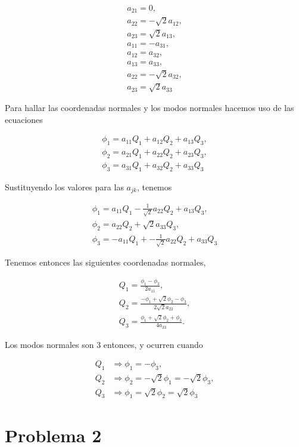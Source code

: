 \documentclass[a4paper,10pt]{article}
\numberwithin{equation}{section}
\begin{document}
\begin{align}
 a_{21} = 0, \\
 a_{22} = -\sqrt{2}a_{12}, \\
 a_{23} = \sqrt{2}a_{13}, \\
 a_{11} = - a_{31}, \\
 a_{12} = a_{32}, \\
 a_{13} = a_{33}, \\
 a_{22} = -\sqrt{2}a_{32}, \\
 a_{23} = \sqrt{2}a_{33}
\end{align}

Para hallar las coordenadas normales y los modos normales hacemos uso de las ecuaciones 

\begin{align}
 \phi_1 = a_{11}Q_1 + a_{12}Q_2 + a_{13}Q_3, \\
 \phi_2 = a_{21}Q_1 + a_{22}Q_2 + a_{23}Q_3, \\
 \phi_3 = a_{31}Q_1 + a_{32}Q_2 + a_{33}Q_3
\end{align}

Sustituyendo los valores para las $a_{jk}$, tenemos 

\begin{align}
 \phi_1 = a_{11}Q_1 -\frac{1}{\sqrt{2}}a_{22} Q_2 + a_{13}Q_3, \\
 \phi_2 = a_{22}Q_2 + \sqrt{2}a_{33}Q_3, \\
 \phi_3 = - a_{11}Q_1 + -\frac{1}{\sqrt{2}}a_{22} Q_2 + a_{33}Q_3
\end{align}

Tenemos entonces las siguientes coordenadas normales,

\begin{align}
 Q_1 = \frac{\phi_1 - \phi_3}{2a_{11}}, \\
 Q_2 = \frac{-\phi_1 + \sqrt{2}\phi_2 - \phi_3}{2\sqrt{2}a_{22}}, \\
 Q_3 = \frac{\phi_1 + \sqrt{2}\phi_2 + \phi_3}{4a_{33}}.
\end{align}

Los modos normales son 3 entonces, y ocurren cuando 

\begin{align}
 Q_1 &\Rightarrow  \phi_1 = -\phi_3, \\
 Q_2 &\Rightarrow  \phi_2 = - \sqrt{2} \phi_1 = - \sqrt{2} \phi_3, \\
 Q_3 &\Rightarrow  \phi_1 = \sqrt{2}\phi_2 = \sqrt{2}\phi_3
\end{align}

\section{Problema 2}
\end{document}
